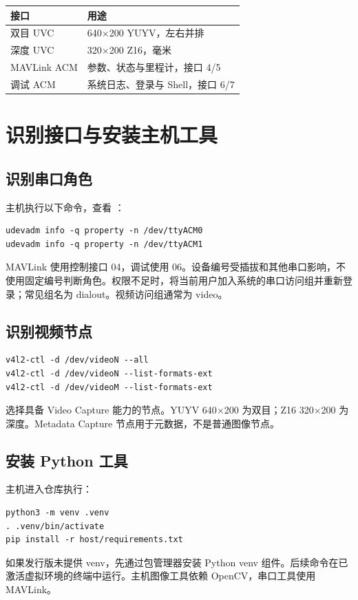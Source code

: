 \par\noindent\begin{tabularx}{\linewidth}{@{}p{28mm}Y@{}}\toprule
接口 & 用途\\\midrule
双目 UVC & 640$\times$200 YUYV，左右并排\\
深度 UVC & 320$\times$200 Z16，毫米\\
MAVLink ACM & 参数、状态与里程计，接口 4/5\\
调试 ACM & 系统日志、登录与 Shell，接口 6/7\\\bottomrule
\end{tabularx}\par
\newpage
\section{识别接口与安装主机工具}
\subsection{识别串口角色}
主机执行以下命令，查看 ：
\begin{lstlisting}
udevadm info -q property -n /dev/ttyACM0
udevadm info -q property -n /dev/ttyACM1
\end{lstlisting}
MAVLink 使用控制接口 04，调试使用 06。设备编号受插拔和其他串口影响，不使用固定编号判断角色。权限不足时，将当前用户加入系统的串口访问组并重新登录；常见组名为 dialout。视频访问组通常为 video。

\subsection{识别视频节点}
\begin{lstlisting}
v4l2-ctl -d /dev/videoN --all
v4l2-ctl -d /dev/videoN --list-formats-ext
v4l2-ctl -d /dev/videoM --list-formats-ext
\end{lstlisting}
选择具备 Video Capture 能力的节点。YUYV 640$\times$200 为双目；Z16 320$\times$200 为深度。Metadata Capture 节点用于元数据，不是普通图像节点。

\subsection{安装 Python 工具}
主机进入仓库执行：
\begin{lstlisting}
python3 -m venv .venv
. .venv/bin/activate
pip install -r host/requirements.txt
\end{lstlisting}
如果发行版未提供 venv，先通过包管理器安装 Python venv 组件。后续命令在已激活虚拟环境的终端中运行。主机图像工具依赖 OpenCV，串口工具使用 MAVLink。


